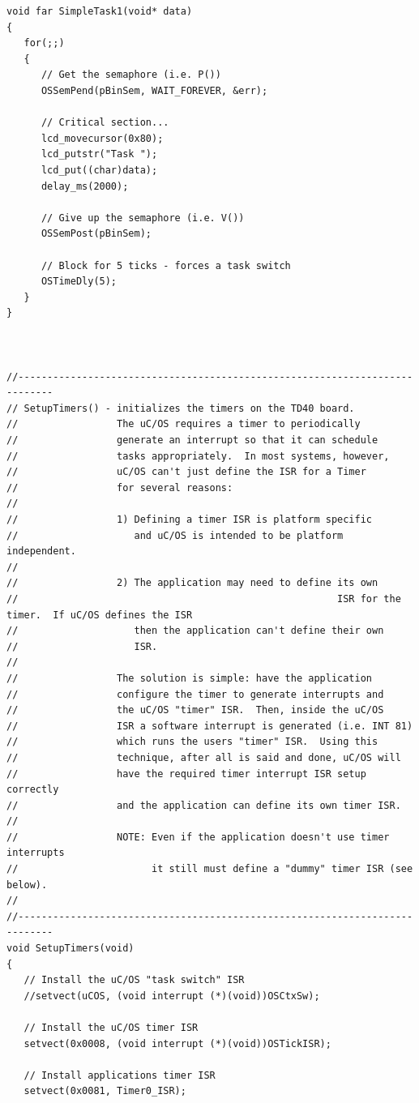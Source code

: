 \documentclass{article}	%
\begin{document}
\begin{verbatim}
void far SimpleTask1(void* data)
{
   for(;;)
   {
      // Get the semaphore (i.e. P())
      OSSemPend(pBinSem, WAIT_FOREVER, &err);

      // Critical section...
      lcd_movecursor(0x80);
      lcd_putstr("Task ");
      lcd_put((char)data);
      delay_ms(2000);

      // Give up the semaphore (i.e. V())
      OSSemPost(pBinSem);

      // Block for 5 ticks - forces a task switch
      OSTimeDly(5);
   }
}



//----------------------------------------------------------------------------
// SetupTimers() - initializes the timers on the TD40 board.
//                 The uC/OS requires a timer to periodically
//                 generate an interrupt so that it can schedule
//                 tasks appropriately.  In most systems, however,
//                 uC/OS can't just define the ISR for a Timer
//                 for several reasons:
//
//                 1) Defining a timer ISR is platform specific
//                    and uC/OS is intended to be platform independent.
//
//                 2) The application may need to define its own
//                                                       ISR for the timer.  If uC/OS defines the ISR
//                    then the application can't define their own
//                    ISR.
//
//                 The solution is simple: have the application
//                 configure the timer to generate interrupts and
//                 the uC/OS "timer" ISR.  Then, inside the uC/OS
//                 ISR a software interrupt is generated (i.e. INT 81)
//                 which runs the users "timer" ISR.  Using this
//                 technique, after all is said and done, uC/OS will
//                 have the required timer interrupt ISR setup correctly
//                 and the application can define its own timer ISR.
//
//                 NOTE: Even if the application doesn't use timer interrupts
//                       it still must define a "dummy" timer ISR (see below).
//
//----------------------------------------------------------------------------
void SetupTimers(void)
{
   // Install the uC/OS "task switch" ISR
   //setvect(uCOS, (void interrupt (*)(void))OSCtxSw);

   // Install the uC/OS timer ISR
   setvect(0x0008, (void interrupt (*)(void))OSTickISR);

   // Install applications timer ISR
   setvect(0x0081, Timer0_ISR);


\end{verbatim}
\end{document}
